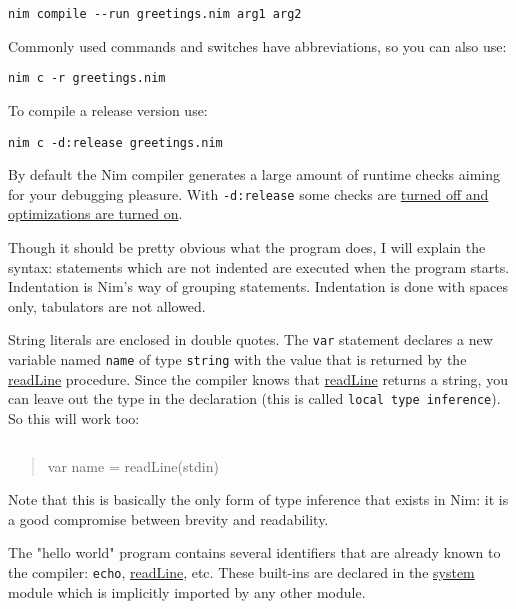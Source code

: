 \begin{verbatim}
nim compile --run greetings.nim arg1 arg2
\end{verbatim}

Commonly used commands and switches have abbreviations, so you can also
use:

\begin{verbatim}
nim c -r greetings.nim
\end{verbatim}

To compile a release version use:

\begin{verbatim}
nim c -d:release greetings.nim
\end{verbatim}

By default the Nim compiler generates a large amount of runtime checks
aiming for your debugging pleasure. With \texttt{-d:release} some checks
are \href{nimc.html\#compiler-usage-compile-time-symbols}{turned off and
optimizations are turned on}.

Though it should be pretty obvious what the program does, I will explain
the syntax: statements which are not indented are executed when the
program starts. Indentation is Nim's way of grouping statements.
Indentation is done with spaces only, tabulators are not allowed.

String literals are enclosed in double quotes. The \texttt{var}
statement declares a new variable named \texttt{name} of type
\texttt{string} with the value that is returned by the
\href{io.html\#readLine,File}{readLine} procedure. Since the compiler
knows that \href{io.html\#readLine,File}{readLine} returns a string, you
can leave out the type in the declaration (this is called
\texttt{local\ type
inference}). So this will work too:

\begin{verbatim}
\end{verbatim}

\begin{quote}
var name = readLine(stdin)
\end{quote}

Note that this is basically the only form of type inference that exists
in Nim: it is a good compromise between brevity and readability.

The "hello world" program contains several identifiers that are already
known to the compiler: \texttt{echo},
\href{io.html\#readLine,File}{readLine}, etc. These built-ins are
declared in the \href{system.html}{system} module which is implicitly
imported by any other module.

